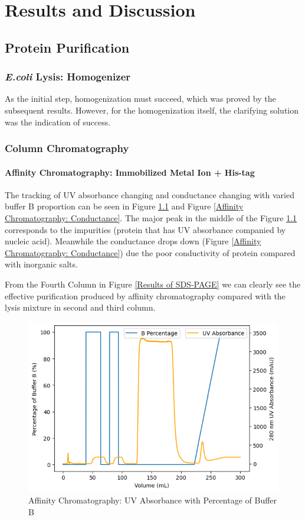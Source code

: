\documentclass{report}
\begin{document}
\chapter{Results and Discussion}
\section{Protein Purification}
\subsection{\textit{E.coli} Lysis: Homogenizer}
As the initial step, homogenization must succeed, which was proved by the subsequent results.
However, for the homogenization itself, the clarifying solution was the indication of success.
\subsection{Column Chromatography}
\subsubsection{Affinity Chromatography: Immobilized  Metal Ion + His-tag}
The tracking of UV absorbance changing and conductance changing with varied buffer B proportion can be seen in Figure \ref{Affinity Chromatography: UV Absorbance} and Figure \ref{Affinity Chromatography: Conductance}.
The major peak in the middle of the Figure \ref{Affinity Chromatography: UV Absorbance} corresponds to the impurities (protein that has UV absorbance companied by nucleic acid).
Meanwhile the conductance drops down (Figure \ref{Affinity Chromatography: Conductance}) due the poor conductivity of protein compared with inorganic salts.

From the Fourth Column in Figure \ref{Results of SDS-PAGE} we can clearly see the effective purification produced by affinity chromatography compared with the lysis mixture in second and third column.

\begin{figure}
    \centering
    \includegraphics[width=0.6\linewidth]{../Figures/Affinity Column UV.png}
    \caption{Affinity Chromatography: UV Absorbance with Percentage of Buffer B}
    \label{Affinity Chromatography: UV Absorbance}
\end{figure}
\end{document}
